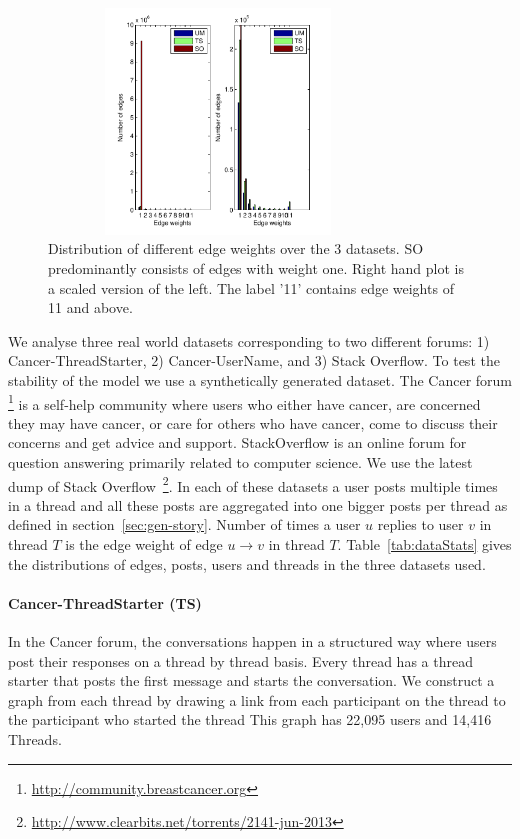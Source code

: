 \documentclass{sig-alternate}
\newcommand{\comment}[1]{\textcolor{red}{[#1]}}
\begin{document}
\begin{figure}
\begin{center}
\includegraphics[height=6cm,width=9cm]{EdgeDistribution.pdf}
\end{center}
\caption{\small{Distribution of different edge weights over the 3 datasets. SO 
predominantly consists of edges with weight one. Right hand plot is a scaled
version of the left. The label '11' contains edge weights of 11 and above.}}
\label{fig:EdgeDistribution}
\end{figure}
We analyse three real world datasets corresponding to two different forums: 1)
Cancer-ThreadStarter, 2) Cancer-UserName, and 3) Stack Overflow. To test the
stability of the model we use a synthetically generated dataset. 
The Cancer forum \footnote{\url{http://community.breastcancer.org}} 
is a self-help community where users who either have cancer, are 
concerned they may have cancer, or care for others who have cancer, 
come to discuss their concerns and get advice and support.
StackOverflow is an
online forum for question answering primarily related to computer science. We
use the latest dump of Stack
Overflow~\footnote{\url{http://www.clearbits.net/torrents/2141-jun-2013}}. In
each of these datasets a user posts multiple times in a thread and all these
posts are aggregated into one bigger posts per thread as defined in
section~\ref{sec:gen-story}.
Number of times a user $u$ replies to user $v$ in thread $T$ is the edge weight
of edge $u\rightarrow v$ in thread $T$.
Table~\ref{tab:dataStats} gives the distributions of edges, posts, users and
threads in the three datasets used. 
\vspace*{-0.5\baselineskip}
\paragraph{Cancer-ThreadStarter (TS)} In the Cancer forum, the conversations happen
in a structured way where users post their responses on a thread by thread
basis. Every thread has a thread starter that posts the first message and
starts the conversation. 
We construct a graph from each thread by drawing a link from each participant on 
the thread to the participant who started the thread
This graph has 22,095 users and 14,416 Threads. 
\vspace*{-0.5\baselineskip}
\end{document}
